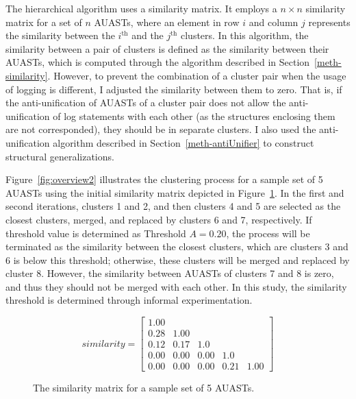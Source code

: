 The hierarchical algorithm uses a similarity matrix. It employs a $n \times n$ similarity matrix for a set of $n$ AUASTs, where an element in row $i$ and column $j$ represents the similarity between the $i^{\text{th}}$ and the $j^{\text{th}}$ clusters. In this algorithm, the similarity between a pair of clusters is defined as the similarity between their AUASTs, which is computed through the algorithm described in Section~\ref{meth-similarity}. However, to prevent the combination of a cluster pair when the usage of logging is different, I adjusted the similarity between them to zero. That is, if the anti-unification of AUASTs of a cluster pair does not allow the anti-unification of log statements with each other (as the structures enclosing them are not corresponded), they should be in separate clusters. I also used the anti-unification algorithm described in Section~\ref{meth-antiUnifier} to construct structural generalizations.

Figure~\ref{fig:overview2} illustrates the clustering process for a sample set of 5 AUASTs using the initial similarity matrix depicted in Figure~\ref{matrix}. In the first and second iterations, clusters 1 and 2, and then clusters 4 and 5 are selected as the closest clusters, merged, and replaced by clusters 6 and 7, respectively. If threshold value is determined as Threshold $A = 0.20$, the process will be terminated as the similarity between the closest clusters, which are clusters 3 and 6 is below this threshold; otherwise, these clusters will be merged and replaced by cluster 8. However, the similarity between AUASTs of clusters 7 and 8 is zero, and thus they should not be merged with each other. In this study, the similarity threshold is determined through informal experimentation.


\begin{figure} [H]
\begin{displaymath}
    similarity = \left[
        \begin{matrix}
        1.00 &  &  &  &   \\
0.28 & 1.00 &  &  &  \\
0.12 & 0.17 & 1.0 &  &  \\
0.00 & 0.00 & 0.00 & 1.0 &  \\
0.00 & 0.00 & 0.00 & 0.21 & 1.00
        \end{matrix}   \right]
\end{displaymath}
 \caption{The similarity matrix for a sample set of 5 AUASTs.}
  \label{matrix}
\end{figure}




